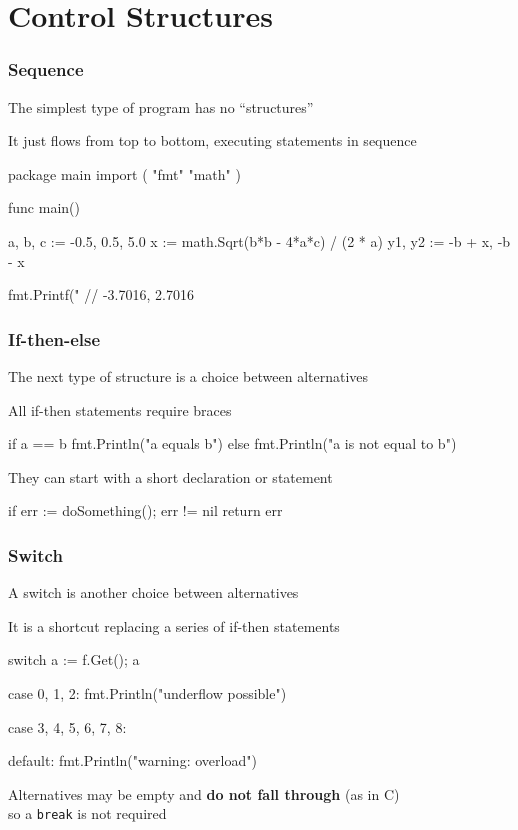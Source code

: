 \documentclass[handout,compress,t,11pt]{beamer}
\begin{document}

\section{Control Structures}

\begin{frame}[fragile]
    \frametitle{Sequence}
    The simplest type of program has no ``structures'' \par
    \vspace{0.5\baselineskip}
    It just flows from top to bottom, executing statements in sequence
\begin{golang}
package main
import (
    "fmt" 
    "math"
)

func main() {
    a, b, c := -0.5, 0.5, 5.0
    x := math.Sqrt(b*b - 4*a*c) / (2 * a)
    y1, y2 := -b + x, -b - x
    
    fmt.Printf("%
    // -3.7016, 2.7016
}

\end{golang}
\end{frame}

\begin{frame}[fragile]
    \frametitle{If-then-else}
    The next type of structure is a choice between alternatives \par
    \vspace{0.5\baselineskip}
    All if-then statements require braces
\begin{golang}
    if a == b {
        fmt.Println("a equals b")
    } else {
        fmt.Println("a is not equal to b")
    }
\end{golang}
    \vspace{0.5\baselineskip}
    They can start with a short declaration or statement
\begin{golang}
    if err := doSomething(); err != nil {
        return err
    }
\end{golang}
\end{frame}

\begin{frame}[fragile]
    \frametitle{Switch}
    A switch is another choice between alternatives \par
    \vspace{0.5\baselineskip}
    It is a shortcut replacing a series of if-then statements
\begin{golang}
    switch a := f.Get(); a {
    case 0, 1, 2:
        fmt.Println("underflow possible")

    case 3, 4, 5, 6, 7, 8:

    default:
        fmt.Println("warning: overload") 
    }
\end{golang}
    \vspace{\baselineskip}
    Alternatives may be empty and {\bf do not fall through} (as in C) \\
    so a \verb|break| is not required
\end{frame}
\end{document}
